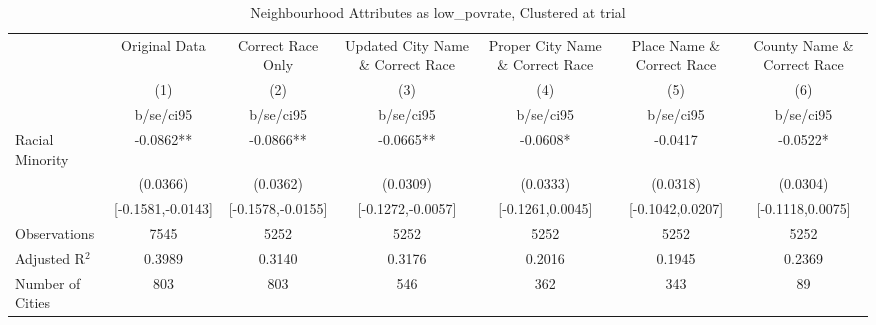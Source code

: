 \documentclass{article}
\begin{document}
\begin{table}[htbp]\centering
\def\sym#1{\ifmmode^{#1}\else\(^{#1}\)\fi}
\caption{Neighbourhood Attributes as low\_povrate, Clustered at trial}
\begin{tabular}{l*{6}{c}}
\toprule
                    &\multicolumn{1}{c}{Original Data}&\multicolumn{1}{c}{Correct Race Only}&\multicolumn{1}{c}{Updated City Name \& Correct Race}&\multicolumn{1}{c}{Proper City Name \& Correct Race}&\multicolumn{1}{c}{Place Name \& Correct Race}&\multicolumn{1}{c}{County Name \& Correct Race}\\\cmidrule(lr){2-2}\cmidrule(lr){3-3}\cmidrule(lr){4-4}\cmidrule(lr){5-5}\cmidrule(lr){6-6}\cmidrule(lr){7-7}
                    &\multicolumn{1}{c}{(1)}   &\multicolumn{1}{c}{(2)}   &\multicolumn{1}{c}{(3)}   &\multicolumn{1}{c}{(4)}   &\multicolumn{1}{c}{(5)}   &\multicolumn{1}{c}{(6)}   \\
                    &   b/se/ci95   &   b/se/ci95   &   b/se/ci95   &   b/se/ci95   &   b/se/ci95   &   b/se/ci95   \\
\midrule
Racial Minority     &     -0.0862** &     -0.0866** &     -0.0665** &     -0.0608*  &     -0.0417   &     -0.0522*  \\
                    &    (0.0366)   &    (0.0362)   &    (0.0309)   &    (0.0333)   &    (0.0318)   &    (0.0304)   \\
                    &[-0.1581,-0.0143]   &[-0.1578,-0.0155]   &[-0.1272,-0.0057]   &[-0.1261,0.0045]   &[-0.1042,0.0207]   &[-0.1118,0.0075]   \\
\midrule
Observations        &        7545   &        5252   &        5252   &        5252   &        5252   &        5252   \\
Adjusted R$^2$      &      0.3989   &      0.3140   &      0.3176   &      0.2016   &      0.1945   &      0.2369   \\
Number of Cities    &         803   &         803   &         546   &         362   &         343   &          89   \\
\bottomrule
\end{tabular}
\end{table}
\end{document}
